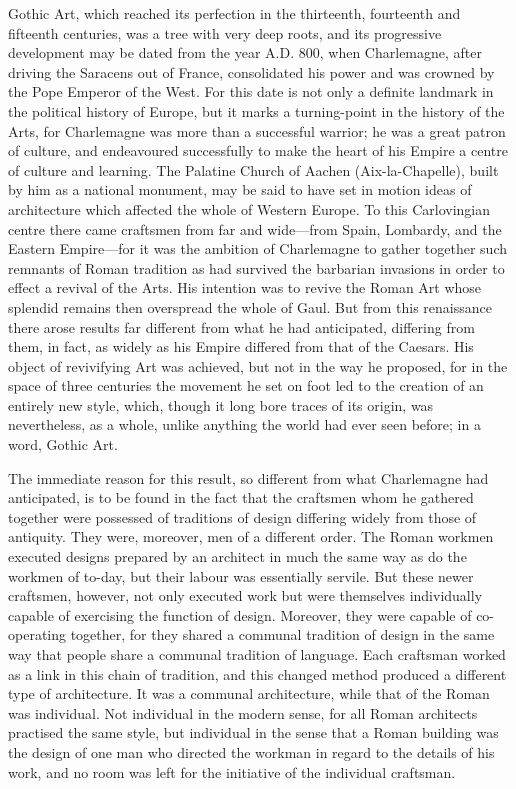 \documentclass{book}
\begin{document}
Gothic Art, which reached its perfection in the thirteenth, fourteenth and fifteenth centuries, was a tree with very deep roots, and its progressive development may be dated from the year A.D. 800, when Charlemagne, after driving the Saracens out of France, consolidated his power and was crowned by the Pope Emperor of the West. For this date is not only a definite landmark in the political history of Europe, but it marks a turning-point in the history of the Arts, for Charlemagne was more than a successful warrior; he was a great patron of culture, and endeavoured successfully to make the heart of his Empire a centre of culture and learning. The Palatine Church of Aachen (Aix-la-Chapelle), built by him as a national monument, may be said to have set in motion ideas of architecture which affected the whole of Western Europe. To this Carlovingian centre there came craftsmen from far and wide—from Spain, Lombardy, and the Eastern Empire—for it was the ambition of Charlemagne to gather together such remnants of Roman tradition as had survived the barbarian invasions in order to effect a revival of the Arts. His intention was to revive the Roman Art whose splendid remains then overspread the whole of Gaul. But from this renaissance there arose results far different from what he had anticipated, differing from them, in fact, as widely as his Empire differed from that of the Caesars. His object of revivifying Art was achieved, but not in the way he proposed, for in the space of three centuries the movement he set on foot led to the creation of an entirely new style, which, though it long bore traces of its origin, was nevertheless, as a whole, unlike anything the world had ever seen before; in a word, Gothic Art.

The immediate reason for this result, so different from what Charlemagne had anticipated, is to be found in the fact that the craftsmen whom he gathered together were possessed of traditions of design differing widely from those of antiquity. They were, moreover, men of a different order. The Roman workmen executed designs prepared by an architect in much the same way as do the workmen of to-day, but their labour was essentially servile. But these newer craftsmen, however, not only executed work but were themselves individually capable of exercising the function of design. Moreover, they were capable of co-operating together, for they shared a communal tradition of design in the same way that people share a communal tradition of language. Each craftsman worked as a link in this chain of tradition, and this changed method produced a different type of architecture. It was a communal architecture, while that of the Roman was individual. Not individual in the modern sense, for all Roman architects practised the same style, but individual in the sense that a Roman building was the design of one man who directed the workman in regard to the details of his work, and no room was left for the initiative of the individual craftsman.
\end{document}

